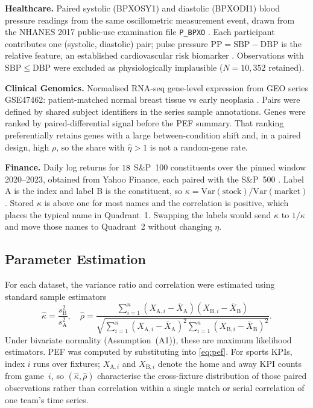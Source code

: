 \textbf{Healthcare.} Paired systolic ({BPXOSY1}) and diastolic ({BPXODI1}) blood pressure readings from the same oscillometric measurement event, drawn from the {NHANES} 2017 public-use examination file \texttt{P\_BPXO} \parencite{nhanes2017pbxo}. Each participant contributes one (systolic, diastolic) pair; pulse pressure $\mathrm{PP}=\mathrm{SBP}-\mathrm{DBP}$ is the relative feature, an established cardiovascular risk biomarker \parencite{franklin1999,blacher1999}. Observations with $\mathrm{SBP}\le\mathrm{DBP}$ were excluded as physiologically implausible ($N=10{,}352$ retained).

\textbf{Clinical Genomics.} Normalised {RNA}-seq gene-level expression from {GEO} series {GSE47462}: patient-matched normal breast tissue vs early neoplasia \parencite{geoGSE47462,brunner2014earlybreast}. Pairs were defined by shared subject identifiers in the series sample annotations. Genes were ranked by paired-differential signal before the PEF summary. That ranking preferentially retains genes with a large between-condition shift and, in a paired design, high $\rho$, so the share with $\hat\eta>1$ is not a random-gene rate.

\textbf{Finance.} Daily log returns for $18$ {S\&P}~100 constituents over the pinned window 2020--2023, obtained from Yahoo Finance, each paired with the {S\&P}~500 \parencite{sharpe1966,sharpe1994,fama1970,carhart1997,fama1993}. Label A is the index and label B is the constituent, so $\kappa=\mathrm{Var}(\mathrm{stock})/\mathrm{Var}(\mathrm{market})$. Stored $\kappa$ is above one for most names and the correlation is positive, which places the typical name in Quadrant~1. Swapping the labels would send $\kappa$ to $1/\kappa$ and move those names to Quadrant~2 without changing $\eta$.

\subsection{Parameter Estimation}

For each dataset, the variance ratio and correlation were estimated using standard sample estimators
\begin{equation}
  \hat{\kappa} = \frac{s^{2}_{\mathrm{B}}}{s^{2}_{\mathrm{A}}},
  \quad
  \hat{\rho} =
  \frac{\sum_{i=1}^{n}(X_{\mathrm{A},i}-\bar{X}_{\mathrm{A}})(X_{\mathrm{B},i}-\bar{X}_{\mathrm{B}})}
       {\sqrt{\sum_{i=1}^{n}(X_{\mathrm{A},i}-\bar{X}_{\mathrm{A}})^{2}
              \sum_{i=1}^{n}(X_{\mathrm{B},i}-\bar{X}_{\mathrm{B}})^{2}}}.
\end{equation}
Under bivariate normality (Assumption~(A1)), these are maximum likelihood estimators. PEF was computed by substituting into \cref{eq:pef}. For sports KPIs, index $i$ runs over fixtures; $X_{\mathrm{A},i}$ and $X_{\mathrm{B},i}$ denote the home and away KPI counts from game~$i$, so $(\hat\kappa,\hat\rho)$ characterise the cross-fixture distribution of those paired observations rather than correlation within a single match or serial correlation of one team's time series.

